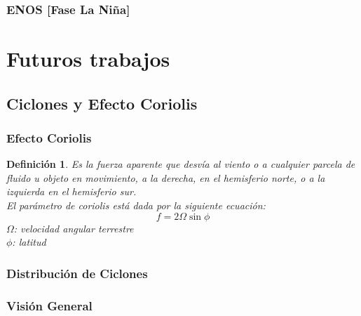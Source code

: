 \documentclass{beamer}
\newtheorem{Th1}{Reseña Historica}
\newtheorem{Th2}{Definición}
\begin{document}
	\begin{frame}
		\frametitle{ENOS [Fase La Niña]}
		\begin{figure}[!hbt]
		   \centering
		\end{figure}
	\end{frame}

	\section{Futuros trabajos}
	\subsection{Ciclones y Efecto Coriolis }
	\begin{frame}
		\frametitle{Efecto Coriolis}
		\begin{Th2}
		Es la fuerza aparente que desvía al viento o a cualquier parcela de fluido u objeto en
		movimiento, a la derecha, en el hemisferio norte, o a la izquierda en el hemisferio sur.\\
		El parámetro de coriolis está dada por la siguiente ecuación: 
			\begin{equation}
				f=2\Omega\sin\phi
			\end{equation}
			$\Omega$: velocidad angular terrestre \\
			$\phi$: latitud
		\end{Th2}
	\end{frame} 

	\begin{frame}
		\frametitle{Distribución de Ciclones}
		\begin{figure}[!hbt]
		   \centering
		\end{figure}
	\end{frame}

	\begin{frame}
		\frametitle{Visión General}
		\begin{figure}[!hbt]
		   \centering
		\end{figure}
	\end{frame}
\end{document}
